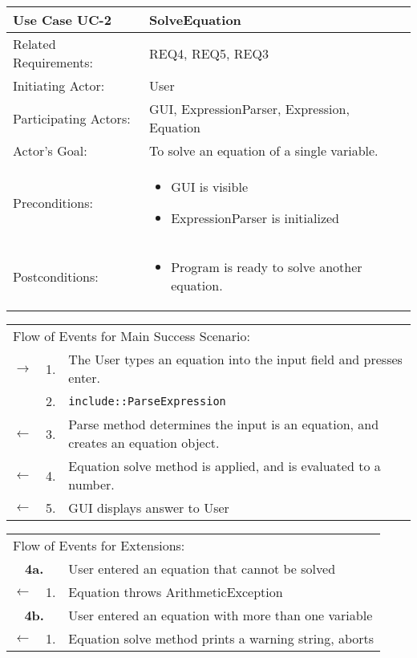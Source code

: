 \documentclass[11pt]{article}
\newcommand{\code}[1]{\texttt{#1}}
\begin{document}
\newpage
\begin{center}
\begin{tabular}{p{1.5in}p{5in}}
\hline
\textbf{Use Case UC-2}     & \textbf{SolveEquation} \\ \hline
Related Requirements: & REQ4, REQ5, REQ3 \\
Initiating Actor:     & User \\
Participating Actors: & GUI, ExpressionParser, Expression, Equation \\
Actor's Goal:          & To solve an equation of a single variable. \\
Preconditions:         & \begin{itemize}[nosep]
                         \item GUI is visible
                         \item ExpressionParser is initialized
                         \end{itemize} \\
Postconditions:        & \begin{itemize}[nosep]
                         \item Program is ready to solve another equation.
                         \end{itemize} \\ \hline
\end{tabular}

\begin{tabular}{p{.25in}p{.25in}p{5.8in}}
\multicolumn{3}{l}{Flow of Events for Main Success Scenario:} \\
$\rightarrow$ & 1. & The User types an equation into the input field and presses enter. \\
            & 2. & \code{include::ParseExpression} \\ 
$\leftarrow$  & 3. & Parse method determines the input is an equation, and creates an equation object. \\
$\leftarrow$  & 4. &Equation solve method is applied, and is evaluated to a number.  \\
$\leftarrow$  & 5. & GUI displays answer to User \\
\end{tabular}

\begin{tabular}{p{.25in}p{.25in}p{5.8in}}
\multicolumn{3}{l}{Flow of Events for Extensions:} \\
\multicolumn{2}{c}{\textbf{4a.}} & User entered an equation that cannot be solved \\
$\leftarrow$  & 1.           & Equation throws ArithmeticException \\

\multicolumn{2}{c}{\textbf{4b.}} & User entered an equation with more than one variable \\
$\leftarrow$  & 1.           & Equation solve method prints a warning string, aborts \\




\end{tabular}
\end{center}
\end{document}
